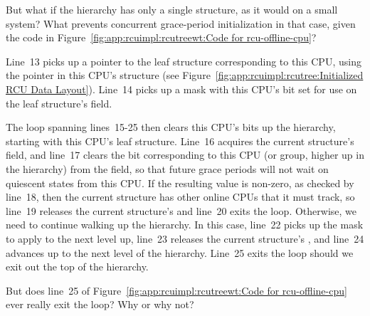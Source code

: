 \QuickQuiz{}
	But what if the  hierarchy has only a single
	structure, as it would on a small system?
	What prevents concurrent grace-period initialization in that
	case, given the code in
	Figure~\ref{fig:app:rcuimpl:rcutreewt:Code for rcu-offline-cpu}?
 \QuickQuizEnd

Line~13 picks up a pointer to the leaf  structure corresponding
to this CPU, using the  pointer in this CPU's 
structure
(see Figure~\ref{fig:app:rcuimpl:rcutree:Initialized RCU Data Layout}).
Line~14 picks up a mask with this CPU's bit set for use on
the leaf  structure's  field.

The loop spanning lines~15-25 then clears this CPU's bits up the
 hierarchy, starting with this CPU's leaf 
structure.
Line~16 acquires the current  structure's 
field, and line~17 clears the bit corresponding to this CPU
(or group, higher up in the hierarchy) from the 
field, so that future grace periods will not wait on quiescent states
from this CPU.
If the resulting  value is non-zero, as checked by
line~18, then the
current  structure has other online CPUs that it
must track, so line~19 releases the current  structure's
 and line~20 exits the loop.
Otherwise, we need to continue walking up the  hierarchy.
In this case, line~22 picks up the mask to apply to the next level up,
line~23 releases the current  structure's ,
and line~24 advances up to the next level of the hierarchy.
Line~25 exits the loop should we exit out the top of the hierarchy.

\QuickQuiz{}
	But does line~25 of
	Figure~\ref{fig:app:rcuimpl:rcutreewt:Code for rcu-offline-cpu}
	ever really exit the loop?
	Why or why not?
 \QuickQuizEnd

